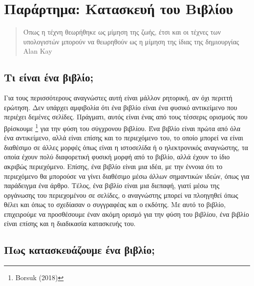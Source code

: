 \documentclass[
]{article}
\author{}
\date{}
\begin{document}
\hypertarget{ux3c0ux3b1ux3c1ux3acux3c1ux3c4ux3b7ux3bcux3b1-ux3baux3b1ux3c4ux3b1ux3c3ux3baux3b5ux3c5ux3ae-ux3c4ux3bfux3c5-ux3b2ux3b9ux3b2ux3bbux3afux3bfux3c5}{%
\section{Παράρτημα: Κατασκευή του
Βιβλίου}\label{ux3c0ux3b1ux3c1ux3acux3c1ux3c4ux3b7ux3bcux3b1-ux3baux3b1ux3c4ux3b1ux3c3ux3baux3b5ux3c5ux3ae-ux3c4ux3bfux3c5-ux3b2ux3b9ux3b2ux3bbux3afux3bfux3c5}}

\begin{quote}
Όπως η τέχνη θεωρήθηκε ως μίμηση της ζωής, έτσι και οι τέχνες των
υπολογιστών μπορούν να θεωρηθούν ως η μίμηση της ίδιας της δημιουργίας
Alan Kay
\end{quote}

\hypertarget{ux3c4ux3b9-ux3b5ux3afux3bdux3b1ux3b9-ux3adux3bdux3b1-ux3b2ux3b9ux3b2ux3bbux3afux3bf}{%
\subsection{Τι είναι ένα
βιβλίο;}\label{ux3c4ux3b9-ux3b5ux3afux3bdux3b1ux3b9-ux3adux3bdux3b1-ux3b2ux3b9ux3b2ux3bbux3afux3bf}}

Για τους περισσότερους αναγνώστες αυτή είναι μάλλον ρητορική, αν όχι
περιττή ερώτηση. Δεν υπάρχει αμφιβολία ότι ένα βιβλίο είναι ένα φυσικό
αντικείμενο που περιέχει δεμένες σελίδες. Πράγματι, αυτός είναι ένας από
τους τέσσερις ορισμούς που βρίσκουμε \footnote{Borsuk (2018)} για την
φύση του σύγχρονου βιβλίου. Ένα βιβλίο είναι πρώτα από όλα ένα
αντικείμενο, αλλά είναι επίσης και το περιεχόμενο του, το οποίο μπορεί
να είναι διαθέσιμο σε άλλες μορφές όπως είναι η ιστοσελίδα ή ο
ηλεκτρονικός αναγνώστης, τα οποία έχουν πολύ διαφορετική φυσική μορφή
από το βιβλίο, αλλά έχουν το ίδιο ακριβώς περιεχόμενο. Επίσης, ένα
βιβλίο είναι μια ιδέα, με την έννοια ότι το περιεχόμενο θα μπορούσε να
γίνει διαθέσιμο μέσω άλλων σημαντικών ιδεών, όπως για παράδειγμα ένα
άρθρο. Τέλος, ένα βιβλίο είναι μια διεπαφή, γιατί μέσω της οργάνωσης του
περιεχομένου σε σελίδες, ο αναγνώστης μπορεί να πλοηγηθεί όπως θέλει και
όπως το σχεδίασαν ο συγγραφέας και ο εκδότης. Με αυτό το βιβλίο,
επιχειρούμε να προσθέσουμε έναν ακόμη ορισμό για την φύση του βιβλίου,
ένα βιβλίο είναι επίσης και η διαδικασία κατασκευής του.

\hypertarget{ux3c0ux3c9ux3c2-ux3baux3b1ux3c4ux3b1ux3c3ux3baux3b5ux3c5ux3acux3b6ux3bfux3c5ux3bcux3b5-ux3adux3bdux3b1-ux3b2ux3b9ux3b2ux3bbux3afux3bf}{%
\subsection{Πως κατασκευάζουμε ένα
βιβλίο;}\label{ux3c0ux3c9ux3c2-ux3baux3b1ux3c4ux3b1ux3c3ux3baux3b5ux3c5ux3acux3b6ux3bfux3c5ux3bcux3b5-ux3adux3bdux3b1-ux3b2ux3b9ux3b2ux3bbux3afux3bf}}
\end{document}
